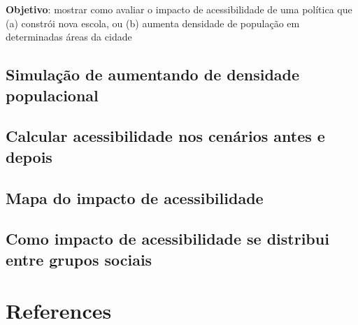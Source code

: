 \documentclass[
  letterpaper,
  DIV=11,
  numbers=noendperiod]{scrreprt}
\begin{document}
\textbf{Objetivo}: mostrar como avaliar o impacto de acessibilidade de
uma política que (a) constrói nova escola, ou (b) aumenta densidade de
população em determinadas áreas da cidade

\hypertarget{simulauxe7uxe3o-de-aumentando-de-densidade-populacional}{%
\section{Simulação de aumentando de densidade
populacional}\label{simulauxe7uxe3o-de-aumentando-de-densidade-populacional}}

\hypertarget{calcular-acessibilidade-nos-cenuxe1rios-antes-e-depois-1}{%
\section{Calcular acessibilidade nos cenários antes e
depois}\label{calcular-acessibilidade-nos-cenuxe1rios-antes-e-depois-1}}

\hypertarget{mapa-do-impacto-de-acessibilidade-1}{%
\section{Mapa do impacto de
acessibilidade}\label{mapa-do-impacto-de-acessibilidade-1}}

\hypertarget{como-impacto-de-acessibilidade-se-distribui-entre-grupos-sociais-1}{%
\section{Como impacto de acessibilidade se distribui entre grupos
sociais}\label{como-impacto-de-acessibilidade-se-distribui-entre-grupos-sociais-1}}

\hypertarget{references}{%
\chapter*{References}\label{references}}
\end{document}
